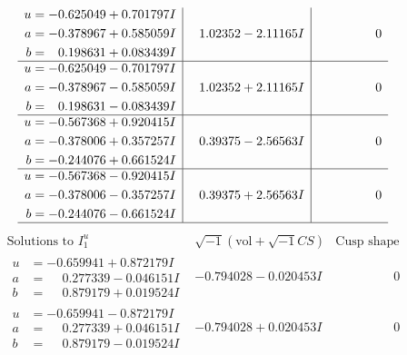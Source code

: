 \documentclass[1p]{elsarticle_modified}
\theoremstyle{definition}
\newcommand{\I}{\sqrt{-1}}
\begin{document}
$$\begin{array}{c|c|c}
\begin{aligned}
u &= -0.625049 + 0.701797 I \\
a &= -0.378967 + 0.585059 I \\
b &= \phantom{-}0.198631 + 0.083439 I\end{aligned}
 & \phantom{-}1.02352 - 2.11165 I & \phantom{-0.000000 } 0 \\ \hline\begin{aligned}
u &= -0.625049 - 0.701797 I \\
a &= -0.378967 - 0.585059 I \\
b &= \phantom{-}0.198631 - 0.083439 I\end{aligned}
 & \phantom{-}1.02352 + 2.11165 I & \phantom{-0.000000 } 0 \\ \hline\begin{aligned}
u &= -0.567368 + 0.920415 I \\
a &= -0.378006 + 0.357257 I \\
b &= -0.244076 + 0.661524 I\end{aligned}
 & \phantom{-}0.39375 - 2.56563 I & \phantom{-0.000000 } 0 \\ \hline\begin{aligned}
u &= -0.567368 - 0.920415 I \\
a &= -0.378006 - 0.357257 I \\
b &= -0.244076 - 0.661524 I\end{aligned}
 & \phantom{-}0.39375 + 2.56563 I & \phantom{-0.000000 } 0\\
 \hline 
 \end{array}$$\newpage$$\begin{array}{c|c|c}  
\text{Solutions to }I^u_{1}& \I (\text{vol} + \sqrt{-1}CS) & \text{Cusp shape}\\
 \hline 
\begin{aligned}
u &= -0.659941 + 0.872179 I \\
a &= \phantom{-}0.277339 - 0.046151 I \\
b &= \phantom{-}0.879179 + 0.019524 I\end{aligned}
 & -0.794028 - 0.020453 I & \phantom{-0.000000 } 0 \\ \hline\begin{aligned}
u &= -0.659941 - 0.872179 I \\
a &= \phantom{-}0.277339 + 0.046151 I \\
b &= \phantom{-}0.879179 - 0.019524 I\end{aligned}
 & -0.794028 + 0.020453 I & \phantom{-0.000000 } 0 \\ \hline\begin{aligned}

\end{aligned}
\end{array}$$
\end{document}
